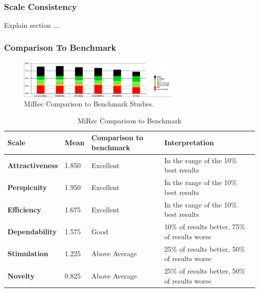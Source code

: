 \subsubsection{Scale Consistency}
Explain section \ldots.

\subsubsection{Comparison To Benchmark}

\begin{figure}[t]
\centering
\includegraphics[width=0.7\textwidth]{figures/mirec-benchmark}
\caption{MiRec Comparison to Benchmark Studies.}
\label{fig:figure57}
\end{figure}


\begin{table}[t]
\centering
\begin{tabular}{|l|l|l|l|}
\hline
\textbf{Scale}          & \textbf{Mean} & \textbf{Comparison to benchmark} & \textbf{Interpretation}                       \\ \hline
\textbf{Attractiveness} & 1.850         & Excellent                         & In the range of the 10\% best results         \\ \hline
\textbf{Perspicuity}    & 1.950         & Excellent                         & In the range of the 10\% best results         \\ \hline
\textbf{Efficiency}     & 1.675         & Excellent                         & In the range of the 10\% best results         \\ \hline
\textbf{Dependability}  & 1.575         & Good                              & 10\% of results better, 75\% of results worse \\ \hline
\textbf{Stimulation}    & 1.225         & Above Average                     & 25\% of results better, 50\% of results worse \\ \hline
\textbf{Novelty}        & 0.825         & Above Average                     & 25\% of results better, 50\% of results worse \\ \hline
\end{tabular}
\caption{MiRec Comparison to Benchmark}
\label{table:table54}
\end{table}


